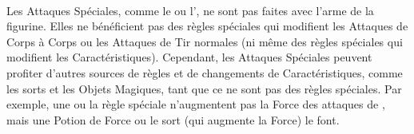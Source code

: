 {\begin{framed}
\begin{multicols}{3}
\hyperlink{notaleader}{\notaleader}\newline
\hyperlink{armourpiercing}{\armourpiercing{}}\newline
\hyperlink{fear}{\fear}\newline
\hyperlink{stomp}{\stomp{}}\newline
\hyperlink{warplatform}{\warplatform}\newline
\hyperlink{reload}{\reload}\newline
\hyperlink{lightningreflexes}{\lightningreflexes}\newline
\hyperlink{regeneration}{\regeneration{}}\newline
\hyperlink{magicresistance}{\magicresistance{}}\newline
\hyperlink{wardsave}{\wardsave{}}\newline
\hyperlink{stupidity}{\stupidity}\newline
\hyperlink{stubborn}{\stubborn}\newline
\hyperlink{terror}{\terror}\newline
\hyperlink{volleyfire}{\volleyfire}\newline
\hyperlink{quicktofire}{\quicktofire}\newline
\hyperlink{multipleshots}{\multipleshots{}}\newline
\hyperlink{skirmisher}{\skirmisher}\newline
\hyperlink{impacthits}{\impacthits{}}\newline
\hyperlink{lighttroops}{\lighttroops}\newline
\hyperlink{fly}{\fly{}}
\end{multicols}
\setlength\columnseprule{0pt}
\vspace*{-10pt}
\end{framed}
}

\paragraph{}

Les Attaques Spéciales, comme le \stomp{} ou l'\breathweapon{}, ne sont pas faites avec l'arme de la figurine. Elles ne bénéficient pas des règles spéciales qui modifient les Attaques de Corps à Corps ou les Attaques de Tir normales (ni même des règles spéciales qui modifient les Caractéristiques). Cependant, les Attaques Spéciales peuvent profiter d'autres sources de règles et de changements de Caractéristiques, comme les sorts et les Objets Magiques, tant que ce ne sont pas des règles spéciales. Par exemple, une \gw{} ou la règle spéciale \thunderouscharge{} n'augmentent pas la Force des attaques de \stomp{}, mais une Potion de Force ou le sort \og \wildernesssignature{} \fg{} (qui augmente la Force) le font.

